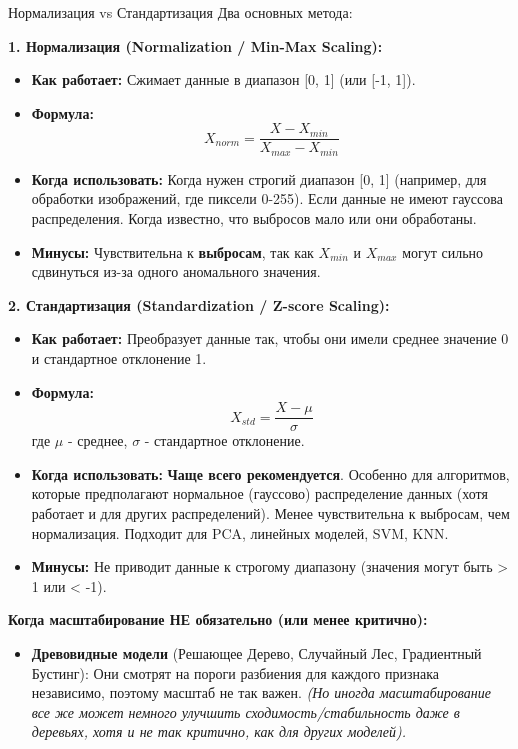 \begin{textbox}{Нормализация vs Стандартизация}
    Два основных метода:

    \textbf{1. Нормализация (Normalization / Min-Max Scaling):}
    \begin{itemize}
        \item \textbf{Как работает:} Сжимает данные в диапазон [0, 1] (или [-1, 1]).
        \item \textbf{Формула:} \[ X_{norm} = \frac{X - X_{min}}{X_{max} - X_{min}} \]
        \item \textbf{Когда использовать:} Когда нужен строгий диапазон [0, 1] (например, для обработки изображений, где пиксели 0-255). Если данные не имеют гауссова распределения. Когда известно, что выбросов мало или они обработаны.
        \item \textbf{Минусы:} Чувствительна к \textbf{выбросам}, так как $X_{min}$ и $X_{max}$ могут сильно сдвинуться из-за одного аномального значения.
    \end{itemize}

    \textbf{2. Стандартизация (Standardization / Z-score Scaling):}
    \begin{itemize}
        \item \textbf{Как работает:} Преобразует данные так, чтобы они имели среднее значение 0 и стандартное отклонение 1.
        \item \textbf{Формула:} \[ X_{std} = \frac{X - \mu}{\sigma} \] где $\mu$ - среднее, $\sigma$ - стандартное отклонение.
        \item \textbf{Когда использовать:} \textbf{Чаще всего рекомендуется}. Особенно для алгоритмов, которые предполагают нормальное (гауссово) распределение данных (хотя работает и для других распределений). Менее чувствительна к выбросам, чем нормализация. Подходит для PCA, линейных моделей, SVM, KNN.
        \item \textbf{Минусы:} Не приводит данные к строгому диапазону (значения могут быть > 1 или < -1).
    \end{itemize}

    \textbf{Когда масштабирование НЕ обязательно (или менее критично):}
    \begin{itemize}
        \item \textbf{Древовидные модели} (Решающее Дерево, Случайный Лес, Градиентный Бустинг): Они смотрят на пороги разбиения для каждого признака независимо, поэтому масштаб не так важен. \textit{(Но иногда масштабирование все же может немного улучшить сходимость/стабильность даже в деревьях, хотя и не так критично, как для других моделей).}
    \end{itemize}
\end{textbox}

